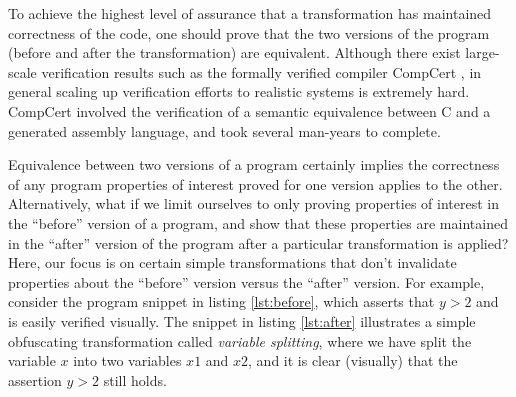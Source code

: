 \documentclass[compsoc,conference,a4paper,10pt,times]{IEEEtran}
\begin{document}
To achieve the highest level of assurance that a transformation has maintained correctness of the code, one should prove that the two versions of the program (before and after the transformation) are equivalent. Although there exist large-scale verification results such as the formally verified compiler CompCert \cite{CompCert}, in general scaling up verification efforts to realistic systems is extremely hard. CompCert involved the verification of a semantic equivalence between C and a generated assembly language, and took several man-years to complete. 

%
Equivalence between two versions of a program certainly implies the correctness of any program properties of interest proved for one version applies to the other.  Alternatively, what if we limit ourselves to only proving properties of interest in the ``before'' version of a program, and show that these properties are maintained in the ``after'' version of the program after a particular transformation is applied? 
%
Here, our focus is on certain simple transformations that don't invalidate properties about the ``before'' version versus the ``after'' version.  For example, consider the program snippet in listing \ref{lst:before}, which asserts that $y > 2$ and is easily verified visually. The snippet in listing \ref{lst:after} illustrates a simple obfuscating transformation called \emph{variable splitting}, where we have split the variable $x$ into two  variables $x1$ and $x2$, and it is clear (visually) that the assertion $y > 2$ still holds.
\end{document}
